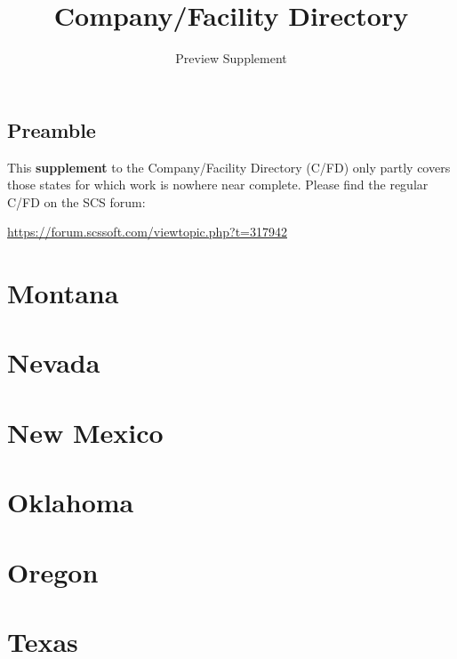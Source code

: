 
\subject{City location descriptions for ATS}
\title{Company\!/Facility Directory}
\subtitle{Preview Supplement}  %


\usepackage{scrlayer-scrpage}  %



\maketitle

\section*{Preamble}

{
\justifying

This \textbf{supplement} to the Company/Facility Directory (C/FD) only partly covers those states for which work is nowhere near complete.
Please find the regular C/FD on the SCS forum:

\centering \vspace{1ex}
\url{https://forum.scssoft.com/viewtopic.php?t=317942} \par
}

\maketoc


%

{%

\chapter{Montana}
}


\chapter{Nevada}


\chapter{New Mexico}


\chapter{Oklahoma}


\chapter{Oregon}


\chapter{Texas}


 

